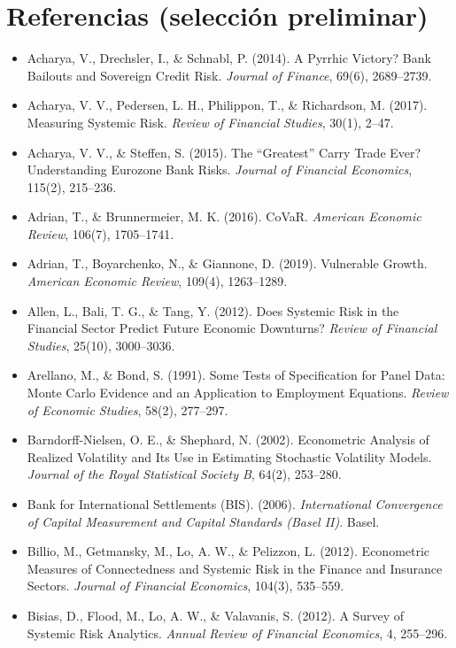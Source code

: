 \documentclass[5p,times,twocolumn,authoryear]{elsarticle}
\begin{document}
\section*{Referencias (selección preliminar)}

\begin{itemize}
    \item Acharya, V., Drechsler, I., \& Schnabl, P. (2014). A Pyrrhic Victory? Bank Bailouts and Sovereign Credit Risk. \textit{Journal of Finance}, 69(6), 2689–2739.
    \item Acharya, V. V., Pedersen, L. H., Philippon, T., \& Richardson, M. (2017). Measuring Systemic Risk. \textit{Review of Financial Studies}, 30(1), 2–47.
    \item Acharya, V. V., \& Steffen, S. (2015). The ``Greatest'' Carry Trade Ever? Understanding Eurozone Bank Risks. \textit{Journal of Financial Economics}, 115(2), 215–236.
    \item Adrian, T., \& Brunnermeier, M. K. (2016). CoVaR. \textit{American Economic Review}, 106(7), 1705–1741.
    \item Adrian, T., Boyarchenko, N., \& Giannone, D. (2019). Vulnerable Growth. \textit{American Economic Review}, 109(4), 1263–1289.
    \item Allen, L., Bali, T. G., \& Tang, Y. (2012). Does Systemic Risk in the Financial Sector Predict Future Economic Downturns? \textit{Review of Financial Studies}, 25(10), 3000–3036.
    \item Arellano, M., \& Bond, S. (1991). Some Tests of Specification for Panel Data: Monte Carlo Evidence and an Application to Employment Equations. \textit{Review of Economic Studies}, 58(2), 277–297.
    \item Barndorff-Nielsen, O. E., \& Shephard, N. (2002). Econometric Analysis of Realized Volatility and Its Use in Estimating Stochastic Volatility Models. \textit{Journal of the Royal Statistical Society B}, 64(2), 253–280.
    \item Bank for International Settlements (BIS). (2006). \textit{International Convergence of Capital Measurement and Capital Standards (Basel II)}. Basel.
    \item Billio, M., Getmansky, M., Lo, A. W., \& Pelizzon, L. (2012). Econometric Measures of Connectedness and Systemic Risk in the Finance and Insurance Sectors. \textit{Journal of Financial Economics}, 104(3), 535–559.
    \item Bisias, D., Flood, M., Lo, A. W., \& Valavanis, S. (2012). A Survey of Systemic Risk Analytics. \textit{Annual Review of Financial Economics}, 4, 255–296.

\end{itemize}
\end{document}
